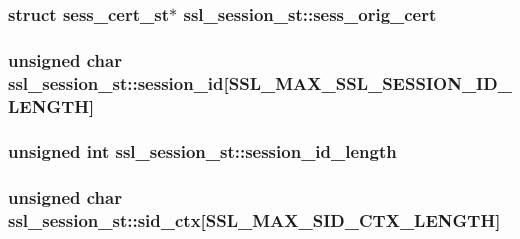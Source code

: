 \hypertarget{structssl__session__st_a3646a4d863a55303ac5ef25ac3359442}{
\subsubsection[{sess\-\_\-orig\-\_\-cert}]{\setlength{\rightskip}{0pt plus 5cm}struct {\bf sess\-\_\-cert\-\_\-st}$\ast$ ssl\-\_\-session\-\_\-st\-::sess\-\_\-orig\-\_\-cert}}\label{structssl__session__st_a3646a4d863a55303ac5ef25ac3359442}
\hypertarget{structssl__session__st_a3e03d6073d29316d9eaecb78938ec92f}{
\subsubsection[{session\-\_\-id}]{\setlength{\rightskip}{0pt plus 5cm}unsigned char ssl\-\_\-session\-\_\-st\-::session\-\_\-id\mbox{[}{\bf S\-S\-L\-\_\-\-M\-A\-X\-\_\-\-S\-S\-L\-\_\-\-S\-E\-S\-S\-I\-O\-N\-\_\-\-I\-D\-\_\-\-L\-E\-N\-G\-T\-H}\mbox{]}}}\label{structssl__session__st_a3e03d6073d29316d9eaecb78938ec92f}
\hypertarget{structssl__session__st_a593371acd210b99ad600853361b807ce}{
\subsubsection[{session\-\_\-id\-\_\-length}]{\setlength{\rightskip}{0pt plus 5cm}unsigned int ssl\-\_\-session\-\_\-st\-::session\-\_\-id\-\_\-length}}\label{structssl__session__st_a593371acd210b99ad600853361b807ce}
\hypertarget{structssl__session__st_ad465f7554a5e14d6c92ee563d5ed6fe1}{
\subsubsection[{sid\-\_\-ctx}]{\setlength{\rightskip}{0pt plus 5cm}unsigned char ssl\-\_\-session\-\_\-st\-::sid\-\_\-ctx\mbox{[}{\bf S\-S\-L\-\_\-\-M\-A\-X\-\_\-\-S\-I\-D\-\_\-\-C\-T\-X\-\_\-\-L\-E\-N\-G\-T\-H}\mbox{]}}}\label{structssl__session__st_ad465f7554a5e14d6c92ee563d5ed6fe1}
